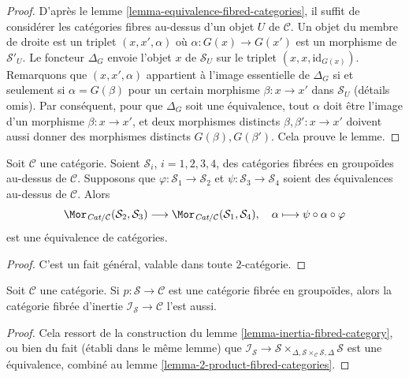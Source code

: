 \begin{proof}
D'après le
lemme \ref{lemma-equivalence-fibred-categories},
il suffit de considérer les catégories fibres au-dessus d'un objet $U$ de $\mathcal{C}$.
Un objet du membre de droite est un triplet $(x, x', \alpha)$ où
$\alpha : G(x) \to G(x')$ est un morphisme de $\mathcal{S}'_U$.
Le foncteur $\Delta_G$ envoie l'objet $x$ de $\mathcal{S}_U$
sur le triplet $(x, x, \text{id}_{G(x)})$. Remarquons que $(x, x', \alpha)$
appartient à l'image essentielle de $\Delta_G$ si et seulement si $\alpha = G(\beta)$
pour un certain morphisme $\beta : x \to x'$ dans $\mathcal{S}_U$ (détails omis).
Par conséquent, pour que $\Delta_G$ soit une équivalence, tout $\alpha$ doit
être l'image d'un morphisme $\beta : x \to x'$, et deux morphismes
distincts $\beta, \beta' : x \to x'$ doivent aussi donner des morphismes distincts
$G(\beta), G(\beta')$. Cela prouve le lemme.
\end{proof}

\begin{lemma}
\label{lemma-morphisms-equivalent-fibred-groupoids}
Soit $\mathcal{C}$ une catégorie.
Soient $\mathcal{S}_i$, $i = 1, 2, 3, 4$, des catégories fibrées en
groupoïdes au-dessus de $\mathcal{C}$.
Supposons que $\varphi : \mathcal{S}_1 \to \mathcal{S}_2$ et
$\psi : \mathcal{S}_3 \to \mathcal{S}_4$ soient des équivalences
au-dessus de $\mathcal{C}$. Alors
$$
\Mor_{\textit{Cat}/\mathcal{C}}(\mathcal{S}_2, \mathcal{S}_3)
\longrightarrow
\Mor_{\textit{Cat}/\mathcal{C}}(\mathcal{S}_1, \mathcal{S}_4),
\quad \alpha \longmapsto \psi \circ \alpha \circ \varphi
$$
est une équivalence de catégories.
\end{lemma}

\begin{proof}
C'est un fait général, valable dans toute $2$-catégorie.
\end{proof}

\begin{lemma}
\label{lemma-inertia-fibred-groupoids}
Soit $\mathcal{C}$ une catégorie.
Si $p : \mathcal{S} \to \mathcal{C}$ est une catégorie fibrée en groupoïdes, alors
la catégorie fibrée d'inertie $\mathcal{I}_\mathcal{S} \to \mathcal{C}$ l'est aussi.
\end{lemma}

\begin{proof}
Cela ressort de la construction du
lemme \ref{lemma-inertia-fibred-category},
ou bien du fait (établi dans le même lemme) que
$\mathcal{I}_\mathcal{S} \to \mathcal{S}
\times_{\Delta, \mathcal{S} \times_\mathcal{C} \mathcal{S}, \Delta}\mathcal{S}$
est une équivalence, combiné au
lemme \ref{lemma-2-product-fibred-categories}.
\end{proof}

